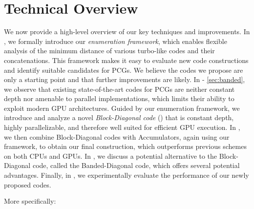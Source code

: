 \section{Technical Overview}\label{sec:overview}

We now provide a high-level overview of our key techniques and improvements. In , we formally introduce our \emph{enumeration framework}, which enables flexible analysis of the minimum distance of various turbo-like codes and their concatenations. This framework makes it easy to evaluate new code constructions and identify suitable candidates for PCGs. We believe the codes we propose are only a starting point and that further improvements are likely.
In  - \ref{sec:banded}, we observe that existing state-of-the-art codes for PCGs are neither constant depth nor amenable to parallel implementations, which limits their ability to exploit modern GPU architectures. Guided by our enumeration framework, we introduce and analyze a novel \emph{Block-Diagonal code} () that is constant depth, highly parallelizable, and therefore well suited for efficient GPU execution.
In , we then combine Block-Diagonal codes with Accumulators, again using our framework, to obtain our final construction, which outperforms previous schemes on both CPUs and GPUs. In , we discuss a potential alternative to the Block-Diagonal code, called the Banded-Diagonal code, which offers several potential advantages. Finally, in , we experimentally evaluate the performance of our newly proposed codes.

\medskip

\noindent More specifically:

